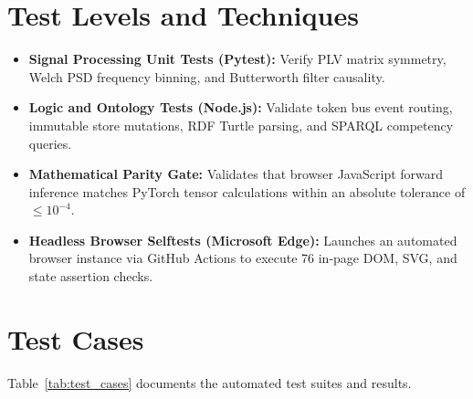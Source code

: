 \documentclass[12pt,a4paper]{report}
\begin{document}
\section{Test Levels and Techniques}
\begin{itemize}[leftmargin=1.5em]
    \item \textbf{Signal Processing Unit Tests (Pytest):} Verify PLV matrix symmetry, Welch PSD frequency binning, and Butterworth filter causality.
    \item \textbf{Logic and Ontology Tests (Node.js):} Validate token bus event routing, immutable store mutations, RDF Turtle parsing, and SPARQL competency queries.
    \item \textbf{Mathematical Parity Gate:} Validates that browser JavaScript forward inference matches PyTorch tensor calculations within an absolute tolerance of $\le 10^{-4}$.
    \item \textbf{Headless Browser Selftests (Microsoft Edge):} Launches an automated browser instance via GitHub Actions to execute 76 in-page DOM, SVG, and state assertion checks.
\end{itemize}

\section{Test Cases}
Table~\ref{tab:test_cases} documents the automated test suites and results.
\end{document}
